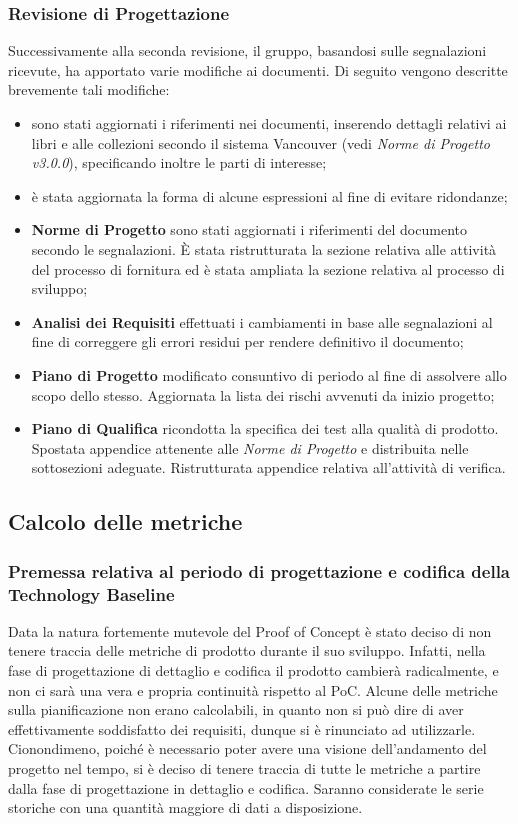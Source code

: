 \subsubsection{Revisione di Progettazione}
Successivamente alla seconda revisione, il gruppo, basandosi sulle 
segnalazioni ricevute, ha apportato varie modifiche ai documenti. 
Di seguito vengono descritte brevemente tali modifiche:
\begin{itemize}
	\item sono stati aggiornati i riferimenti nei documenti, inserendo dettagli relativi ai libri e alle collezioni secondo il sistema Vancouver (vedi \textit{Norme di Progetto v3.0.0}), specificando inoltre le parti di interesse;
	\item è stata aggiornata la forma di alcune espressioni al fine di evitare ridondanze;
	\item \textbf{Norme di Progetto} sono stati aggiornati i riferimenti del documento secondo le segnalazioni. \`E stata ristrutturata la sezione relativa alle attività del processo di fornitura ed è stata ampliata la sezione relativa al processo di sviluppo;
	\item \textbf{Analisi dei Requisiti} effettuati i cambiamenti in base alle segnalazioni al fine di correggere gli errori residui per rendere definitivo il documento;
	\item \textbf{Piano di Progetto} modificato consuntivo di periodo al fine di assolvere allo scopo dello stesso. Aggiornata la lista dei rischi avvenuti da inizio progetto;
	\item \textbf{Piano di Qualifica} ricondotta la specifica dei test alla qualità di prodotto. Spostata appendice attenente alle \textit{Norme di Progetto} e distribuita nelle sottosezioni adeguate. Ristrutturata appendice relativa all'attività di verifica.
\end{itemize}

\subsection{Calcolo delle metriche}
\subsubsection{Premessa relativa al periodo di progettazione e codifica della Technology Baseline}
Data la natura fortemente mutevole del Proof of Concept è stato deciso di non tenere traccia delle metriche di prodotto durante il suo sviluppo. Infatti, nella fase di progettazione di dettaglio e codifica il prodotto cambierà radicalmente, e non ci sarà una vera e propria continuità rispetto al PoC. \newline
Alcune delle metriche sulla pianificazione non erano calcolabili, in quanto non si può dire di aver effettivamente soddisfatto dei requisiti, dunque si è rinunciato ad utilizzarle.
Cionondimeno, poiché è necessario poter avere una visione dell'andamento del progetto nel tempo, si è deciso di tenere traccia di tutte le metriche a partire dalla fase di progettazione in dettaglio e codifica. Saranno considerate le serie storiche con una quantità maggiore di dati a disposizione.

